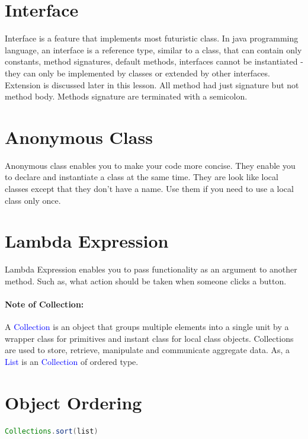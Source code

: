 \documentclass[10 pt]{book}
\begin{document}
\section{Interface}
Interface is a feature that implements most futuristic class. In java programming language, an interface is a reference type, similar to a class, that can contain only constants, method signatures, default methods, interfaces cannot be instantiated - they can only be implemented by classes or extended by other interfaces. Extension is discussed later in this lesson. All method had just signature but not method body. Methods signature are terminated with a semicolon.

\section{Anonymous Class}
Anonymous class enables you to make your code more concise. They enable you to declare and instantiate a class at the same time. They are look like local classes except that they don't have a name.\hfill
Use them if you need to use a local class only once.

\section{Lambda Expression}
Lambda Expression enables you to pass functionality as an argument to another method. Such as, what action should be taken when someone clicks a button.
\paragraph{Note of Collection:}A \textcolor{blue}{Collection} is an object that groups multiple elements into a single unit by a wrapper class for primitives and instant class for local class objects. Collections are used to store, retrieve, manipulate and communicate aggregate data. As, a \textcolor{blue}{List} is an \textcolor{blue}{Collection} of ordered type.

\section{Object Ordering}
\begin{framed}
	\begin{lstlisting}[language = java]
		Collections.sort(list)
	\end{lstlisting}
\end{framed}
\end{document}
